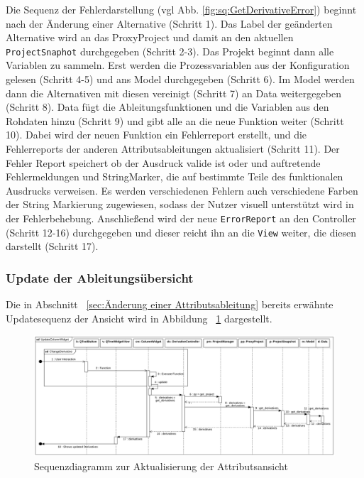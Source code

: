 \documentclass{article}
\begin{document}
Die Sequenz der Fehlerdarstellung (vgl Abb. \ref{fig:sq:GetDerivativeError}) beginnt nach der Änderung einer Alternative (Schritt 1). Das Label der geänderten Alternative wird an das ProxyProject und damit an den aktuellen \texttt{ProjectSnaphot} durchgegeben (Schritt 2-3). Das Projekt beginnt dann alle Variablen zu sammeln. Erst werden die Prozessvariablen aus der Konfiguration gelesen (Schritt 4-5) und ans Model durchgegeben (Schritt 6). Im Model werden dann die Alternativen mit diesen vereinigt (Schritt 7) an Data weitergegeben (Schritt 8). Data fügt die Ableitungsfunktionen und die Variablen aus den Rohdaten hinzu (Schritt 9) und gibt alle an die neue Funktion weiter (Schritt 10). Dabei wird der neuen Funktion ein Fehlerreport erstellt, und die Fehlerreports der anderen Attributsableitungen aktualisiert (Schritt 11). Der Fehler Report speichert ob der Ausdruck valide ist oder und auftretende Fehlermeldungen und StringMarker, die auf bestimmte Teile des funktionalen Ausdrucks verweisen. Es werden verschiedenen Fehlern auch verschiedene Farben der String Markierung zugewiesen, sodass der Nutzer visuell unterstützt wird in der Fehlerbehebung. Anschließend wird der neue \texttt{ErrorReport} an den Controller (Schritt 12-16) durchgegeben und dieser reicht ihn an die \texttt{View} weiter, die diesen darstellt (Schritt 17).

\subsubsection{Update der Ableitungsübersicht}\label{sec:Update der Ableitungsübersicht}
Die in Abschnitt ~\ref{sec:Änderung einer Attributsableitung} bereits erwähnte Updatesequenz der Ansicht wird in Abbildung ~\ref{fig:sq:UpdateColumnWidgetSequenceDiagram} dargestellt.

\begin{figure}[H]%
    \centering
    \includegraphics[width=13cm]{entwurf/Floriane/UpdateColumnWidget.png}
    \caption{Sequenzdiagramm zur Aktualisierung der Attributsansicht}
    \label{fig:sq:UpdateColumnWidgetSequenceDiagram}
\end{figure}
\end{document}
